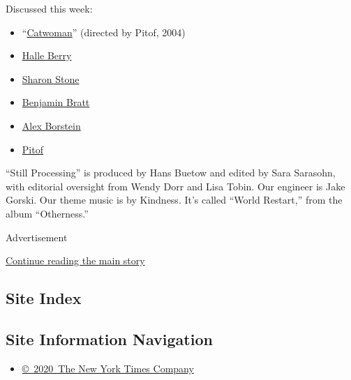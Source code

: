 Discussed this week:

\begin{itemize}
\item
  ``\href{https://www.imdb.com/title/tt0327554/}{Catwoman}'' (directed
  by Pitof, 2004)
\item
  \href{https://www.imdb.com/name/nm0000932/}{Halle Berry}
\item
  \href{https://www.imdb.com/name/nm0000232/}{Sharon Stone}
\item
  \href{https://www.imdb.com/name/nm0000973/}{Benjamin Bratt}
\item
  \href{https://www.imdb.com/name/nm0097504/}{Alex Borstein}
\item
  \href{https://www.imdb.com/name/nm0685759/}{Pitof}
\end{itemize}

``Still Processing'' is produced by Hans Buetow and edited by Sara
Sarasohn, with editorial oversight from Wendy Dorr and Lisa Tobin. Our
engineer is Jake Gorski. Our theme music is by Kindness. It's called
``World Restart,'' from the album ``Otherness.''

Advertisement

\protect\hyperlink{after-bottom}{Continue reading the main story}

\hypertarget{site-index}{%
\subsection{Site Index}\label{site-index}}

\hypertarget{site-information-navigation}{%
\subsection{Site Information
Navigation}\label{site-information-navigation}}

\begin{itemize}
\tightlist
\item
  \href{https://help.nytimes3xbfgragh.onion/hc/en-us/articles/115014792127-Copyright-notice}{©~2020~The
  New York Times Company}
\end{itemize}


